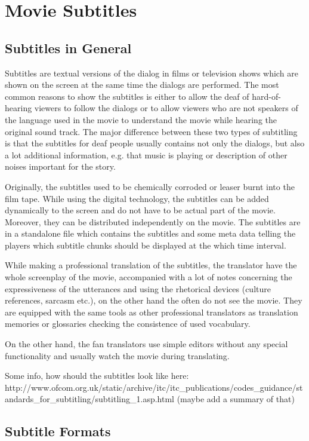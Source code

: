 \section{Movie Subtitles}
\subsection{Subtitles in General}

Subtitles are textual versions of the dialog in films or television shows which are shown on the screen at the same time the dialogs are performed. The most common reasons to show the subtitles is either to allow the deaf of hard-of-hearing viewers to follow the dialogs or to allow viewers who are not speakers of the language used in the movie to understand the movie while hearing the original sound track. The major difference between these two types of subtitling is that the subtitles for deaf people usually contains not only the dialogs, but also a lot additional information, e.g. that music is playing or description of other noises important for the story. 

Originally, the subtitles used to be chemically corroded or leaser burnt into the film tape. While using the digital technology, the subtitles can be added dynamically to the screen and do not have to be actual part of the movie. Moreover, they can be distributed independently on the movie. The subtitles are in a standalone file which contains the subtitles and some meta data telling the players which subtitle chunks should be displayed at the which time interval.

While making a professional translation of the subtitles, the translator have the whole screenplay of the movie, accompanied with a lot of notes concerning the expressiveness of the utterances and using the rhetorical devices (culture references, sarcasm etc.), on the other hand the often do not see the movie. They are equipped with the same tools as other professional translators as translation memories or glossaries checking the consistence of used vocabulary.

On the other hand, the fan translators use simple editors without any special functionality and usually watch the movie during translating.

Some info, how should the subtitles look like here: 
http://www.ofcom.org.uk/static/archive/itc/itc\_publications/codes\_guidance/standards\_for\_subtitling/subtitling\_1.asp.html
(maybe add a summary of that)

\subsection{Subtitle Formats}
\label{subtitle_formats}


